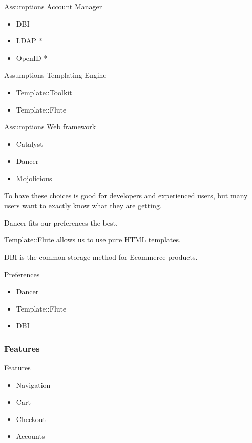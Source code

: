 \begin{frame}{Assumptions}
Account Manager
\begin{itemize}
\item DBI
\item LDAP *
\item OpenID *
\end{itemize}
\end{frame}

\begin{frame}{Assumptions}
Templating Engine
\begin{itemize}
\item Template::Toolkit
\item Template::Flute
\end{itemize}
\end{frame}

\begin{frame}{Assumptions}
Web framework
\begin{itemize}
\item Catalyst
\item Dancer
\item Mojolicious
\end{itemize}
\end{frame}

To have these choices is good for developers and experienced users, 
but many users want to exactly know what they are getting.

Dancer fits our preferences the best.

Template::Flute allows us to use pure HTML templates.

DBI is the common storage method for Ecommerce products.

\begin{frame}{Preferences}
\begin{itemize}
\item Dancer
\item Template::Flute
\item DBI
\end{itemize}
\end{frame}

\subsubsection{Features}
\begin{frame}{Features}
\begin{itemize}
\item Navigation
\item Cart
\item Checkout
\item Accounts
\end{itemize}
\end{frame}

